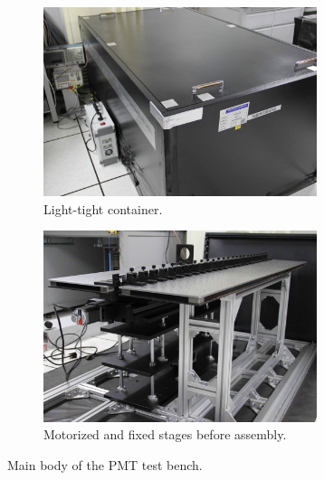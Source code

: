\documentclass{nst}
\begin{document}
\begin{figure}[!htb]
	\begin{subfigure}[t]{80mm}
		\includegraphics[width=80mm]{FIG2_a}
		\caption{Light-tight container.}
		\label{fig:FIG2_a}
	\end{subfigure}
	\begin{subfigure}[t]{80mm}
		\includegraphics[width=80mm]{FIG2_b}
		\caption{Motorized and fixed stages before assembly.}
		\label{fig:FIG2_b}
	\end{subfigure}
	\caption{Main body of the PMT test bench.}
	\label{fig:FIG2}
\end{figure}
\end{document}
